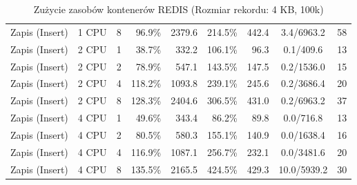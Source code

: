 \begin{table}[ht]
{\begin{tabular}{llcrrrrcc}
Zapis (Insert) & 1 CPU & 8 & 96.9\% & 2379.6 & 214.5\% & 442.4 & 3.4/6963.2 & 58 \\
Zapis (Insert) & 2 CPU & 1 & 38.7\% & 332.2 & 106.1\% & 96.3 & 0.1/409.6 & 13 \\
Zapis (Insert) & 2 CPU & 2 & 78.9\% & 547.1 & 143.5\% & 147.5 & 0.2/1536.0 & 15 \\
Zapis (Insert) & 2 CPU & 4 & 118.2\% & 1093.8 & 239.1\% & 245.6 & 0.2/3686.4 & 20 \\
Zapis (Insert) & 2 CPU & 8 & 128.3\% & 2404.6 & 306.5\% & 431.0 & 0.2/6963.2 & 37 \\
Zapis (Insert) & 4 CPU & 1 & 49.6\% & 343.4 & 86.2\% & 89.8 & 0.0/716.8 & 13 \\
Zapis (Insert) & 4 CPU & 2 & 80.5\% & 580.3 & 155.1\% & 140.9 & 0.0/1638.4 & 16 \\
Zapis (Insert) & 4 CPU & 4 & 116.9\% & 1087.1 & 256.7\% & 232.1 & 0.0/3481.6 & 20 \\
Zapis (Insert) & 4 CPU & 8 & 135.5\% & 2165.5 & 424.5\% & 429.3 & 10.0/5939.2 & 30 \\
\bottomrule
\end{tabular}%
}
\caption{Zużycie zasobów kontenerów REDIS (Rozmiar rekordu: 4 KB, 100k)}
\label{tab:resources_redis_medium_100000}
\end{table}
